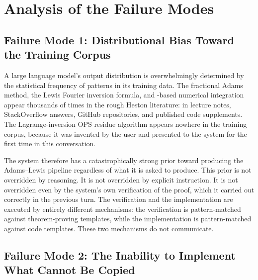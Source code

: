 \documentclass{article}
\newcommand{\tmtexttt}[1]{\text{{\ttfamily{#1}}}}
\begin{document}
\section{Analysis of the Failure Modes}

\subsection{Failure Mode 1: Distributional Bias Toward the Training Corpus}

A large language model's output distribution is overwhelmingly determined by
the statistical frequency of patterns in its training data. The fractional
Adams method, the Lewis Fourier inversion formula, and \tmtexttt{scipy}-based
numerical integration appear thousands of times in the rough Heston
literature: in lecture notes, StackOverflow answers, GitHub repositories, and
published code supplements. The Lagrange-inversion OPS residue algorithm
appears nowhere in the training corpus, because it was invented by the user
and presented to the system for the first time in this conversation.

The system therefore has a catastrophically strong prior toward producing the
Adams--Lewis pipeline regardless of what it is asked to produce. This prior is
not overridden by reasoning. It is not overridden by explicit instruction. It
is not overridden even by the system's own verification of the proof, which it
carried out correctly in the previous turn. The verification and the
implementation are executed by entirely different mechanisms: the verification
is pattern-matched against theorem-proving templates, while the implementation
is pattern-matched against code templates. These two mechanisms do not
communicate.

\subsection{Failure Mode 2: The Inability to Implement What Cannot Be Copied}
\end{document}
